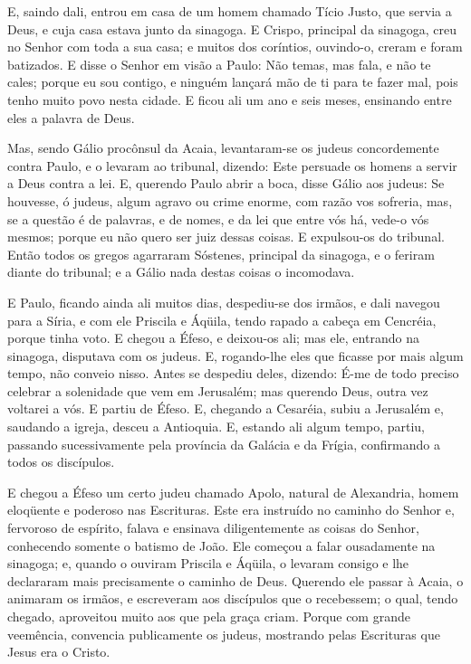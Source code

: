 E, saindo dali, entrou em casa de um homem chamado Tício Justo,
que servia a Deus, e cuja casa estava junto da sinagoga. E
Crispo, principal da sinagoga, creu no Senhor com toda a sua casa; e
muitos dos coríntios, ouvindo-o, creram e foram batizados. E
disse o Senhor em visão a Paulo: Não temas, mas fala, e não te
cales; porque eu sou contigo, e ninguém lançará mão de ti
para te fazer mal, pois tenho muito povo nesta cidade. E
ficou ali um ano e seis meses, ensinando entre eles a palavra de
Deus.

Mas, sendo Gálio procônsul da Acaia, levantaram-se os judeus
concordemente contra Paulo, e o levaram ao tribunal, dizendo:
Este persuade os homens a servir a Deus contra a lei. E,
querendo Paulo abrir a boca, disse Gálio aos judeus: Se houvesse, ó
judeus, algum agravo ou crime enorme, com razão vos sofreria,
mas, se a questão é de palavras, e de nomes, e da lei que
entre vós há, vede-o vós mesmos; porque eu não quero ser juiz dessas
coisas. E expulsou-os do tribunal. Então todos os
gregos agarraram Sóstenes, principal da sinagoga, e o feriram diante
do tribunal; e a Gálio nada destas coisas o incomodava.

E Paulo, ficando ainda ali muitos dias, despediu-se dos irmãos, e
dali navegou para a Síria, e com ele Priscila e Áqüila, tendo rapado
a cabeça em Cencréia, porque tinha voto. E chegou a Éfeso, e
deixou-os ali; mas ele, entrando na sinagoga, disputava com os
judeus. E, rogando-lhe eles que ficasse por mais algum tempo,
não conveio nisso. Antes se despediu deles, dizendo: É-me de
todo preciso celebrar a solenidade que vem em Jerusalém; mas
querendo Deus, outra vez voltarei a vós. E partiu de Éfeso.
E, chegando a Cesaréia, subiu a Jerusalém e, saudando a
igreja, desceu a Antioquia. E, estando ali algum tempo,
partiu, passando sucessivamente pela província da Galácia e da
Frígia, confirmando a todos os discípulos.

E chegou a Éfeso um certo judeu chamado Apolo, natural de
Alexandria, homem eloqüente e poderoso nas Escrituras. Este
era instruído no caminho do Senhor e, fervoroso de espírito, falava
e ensinava diligentemente as coisas do Senhor, conhecendo somente o
batismo de João. Ele começou a falar ousadamente na sinagoga;
e, quando o ouviram Priscila e Áqüila, o levaram consigo e lhe
declararam mais precisamente o caminho de Deus. Querendo ele
passar à Acaia, o animaram os irmãos, e escreveram aos discípulos
que o recebessem; o qual, tendo chegado, aproveitou muito aos que
pela graça criam. Porque com grande veemência, convencia
publicamente os judeus, mostrando pelas Escrituras que Jesus era o
Cristo.


